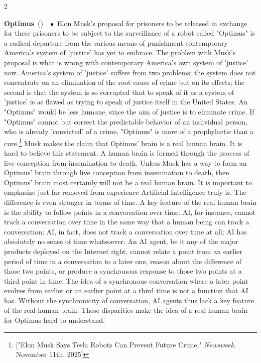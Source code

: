 \documentclass[10pt,a4paper,twoside]{article} %
\newcommand{\entry}[4]{\markboth{#1}{#1}\textbf{#1}\ {(#2)}\ \textit{#3}\ $\bullet$\ {#4}}  %
\begin{document}
\begin{multicols}{2}
\entry{Optimus} {} {} {Elon Musk's proposal for prisoners to be released in exchange for these prisoners to be subject to the surveillance of a robot called "Optimus" is a radical departure from the various means of punishment contemporary America's system of 'justice' has yet to embrace. The problem with Musk's proposal is what is wrong with contemporary America's own system of 'justice' now. America's system of 'justice' suffers from two problems; the system does not concentrate on an elimination of the root cause of crime but on its effects; the second is that the system is so corrupted that to speak of it as a system of 'justice' is as flawed as trying to speak of justice itself in the United States. \newline \indent An "Optimus" would be less humane, since the aim of justice is to eliminate crime. If "Optimus" cannot but correct the predictable behavior of an individual person, who is already 'convicted' of a crime, "Optimus" is more of a prophylactic than a cure.\footnote{["Elon Musk Says Tesla Robots Can Prevent Future Crime," \emph{Newsweek}. November 11th, 2025]} \newline \indent Musk makes the claim that Optimus' brain is a real human brain. It is hard to believe this statement. A human brain is formed through the process of live conception from insemination to death. Unless Musk has a way to form an Optimus' brain through live conception from insemination to death, then Optimus' brain most certainly will not be a real human brain. It is important to emphasize just far removed from experience Artificial Intelligence truly is. The difference is even stronger in terms of time. A key feature of the real human brain is the ability to follow points in a conversation over time. AI, for instance, cannot track a conversation over time in the same way that a human being can track a conversation; AI, in fact, does not track a conversation over time at all; AI has absolutely no sense of time whatsoever. An AI agent, be it any of the major products deployed on the Internet right, cannot relate a point from an earlier period of time in a conversation to a later one, reason about the difference of those two points, or produce a synchronous response to those two points at a third point in time. The idea of a synchronous conversation where a later point evolves from earlier or an earlier point at a third time is not a function that AI has. Without the synchronicity of conversation, AI agents thus lack a key feature of the real human brain. These disparities make the idea of a real human brain for Optimus hard to understand.}


\end{multicols}
\end{document}
